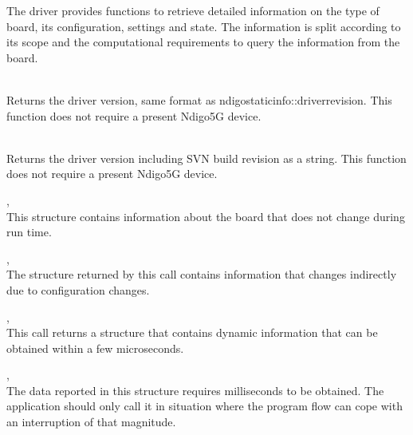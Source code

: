             The driver provides functions to retrieve detailed information on the type of board, its configuration, settings and state. The information is split according to its scope and the computational requirements to query the information from the board.\par

            \\
            Returns the driver version, same format as ndigo\tu static\tu info::driver\tu revision. This function does not require a
            present Ndigo5G device.

            \\
            Returns the driver version including SVN build revision as a string. This function does not require a
            present Ndigo5G device.

            ,\\
            This structure contains information about the board that does not change during run time.\par

            , \\
            The structure returned by this call contains information that changes indirectly due to configuration changes.\par

            , \\
            This call returns a structure that contains dynamic information that can be obtained within a few microseconds.\par

            , \\
            The data reported in this structure requires milliseconds to be obtained. The application should only call it in situation where the program flow can cope with an interruption of that magnitude.

        \\
